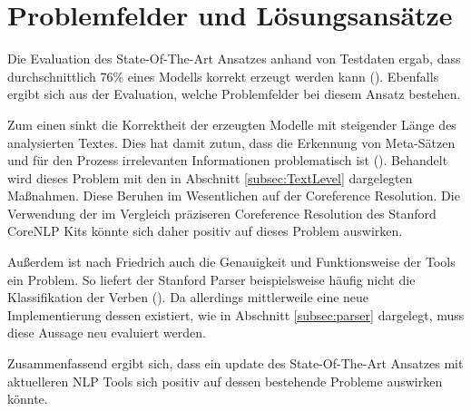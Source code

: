 \section{Problemfelder und Lösungsansätze}
Die Evaluation des State-Of-The-Art Ansatzes anhand von Testdaten ergab, dass durchschnittlich 76\% eines Modells korrekt erzeugt werden kann (\cite[vgl.][115]{FRIEDRICH1}). Ebenfalls ergibt sich aus der Evaluation, welche Problemfelder bei diesem Ansatz bestehen.\par Zum einen sinkt die Korrektheit der erzeugten Modelle mit steigender Länge des analysierten Textes. Dies hat damit zutun, dass die Erkennung von Meta-Sätzen und für den Prozess irrelevanten Informationen problematisch ist (\cite[vgl.][116]{FRIEDRICH1}). Behandelt wird dieses Problem mit den in Abschnitt \ref{subsec:TextLevel} dargelegten Maßnahmen. Diese Beruhen im Wesentlichen auf der Coreference Resolution. Die Verwendung der im Vergleich präziseren Coreference Resolution des Stanford CoreNLP Kits könnte sich daher positiv auf dieses Problem auswirken.\par
Außerdem ist nach Friedrich auch die Genauigkeit und Funktionsweise der Tools ein Problem. So liefert der Stanford Parser beispielsweise häufig nicht die Klassifikation der Verben (\cite[vgl.][117 ff.]{FRIEDRICH1}). Da allerdings mittlerweile eine neue Implementierung dessen existiert, wie in Abschnitt \ref{subsec:parser} dargelegt, muss diese Aussage neu evaluiert werden.\par
Zusammenfassend ergibt sich, dass ein update des State-Of-The-Art Ansatzes mit aktuelleren \ac{NLP} Tools sich positiv auf dessen bestehende Probleme auswirken könnte.


